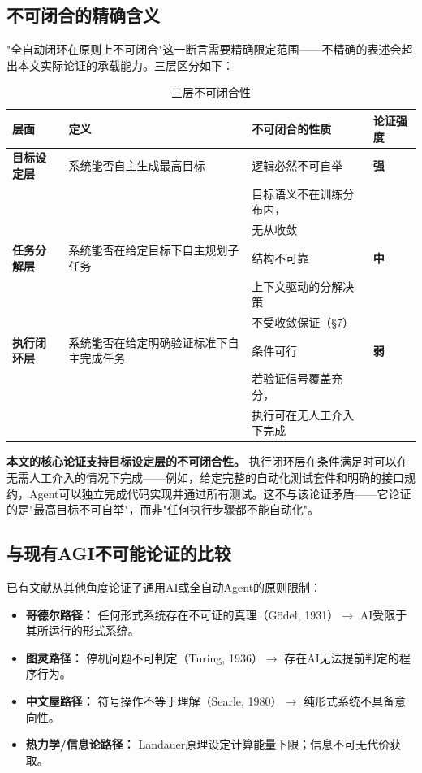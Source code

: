 \documentclass[11pt,a4paper]{ctexart}
\begin{document}
\subsection{不可闭合的精确含义}

"全自动闭环在原则上不可闭合"这一断言需要精确限定范围——不精确的表述会超出本文实际论证的承载能力。三层区分如下：

\begin{table}[htbp]
\centering
\caption{三层不可闭合性}
\label{tab:three_layers}
\begin{tabular}{@{}p{2.5cm}p{4cm}p{2.5cm}p{2.5cm}@{}}
\toprule
\textbf{层面} & \textbf{定义} & \textbf{不可闭合的性质} & \textbf{论证强度} \\
\midrule
\textbf{目标设定层} & 系统能否自主生成最高目标 & 逻辑必然不可自举 & \textbf{强} \\
& & 目标语义不在训练分布内，& \\
& & 无从收敛 & \\
\midrule
\textbf{任务分解层} & 系统能否在给定目标下自主规划子任务 & 结构不可靠 & \textbf{中} \\
& & 上下文驱动的分解决策 & \\
& & 不受收敛保证（§7） & \\
\midrule
\textbf{执行闭环层} & 系统能否在给定明确验证标准下自主完成任务 & 条件可行 & \textbf{弱} \\
& & 若验证信号覆盖充分，& \\
& & 执行可在无人工介入下完成 & \\
\bottomrule
\end{tabular}
\end{table}

\textbf{本文的核心论证支持目标设定层的不可闭合性。} 执行闭环层在条件满足时可以在无需人工介入的情况下完成——例如，给定完整的自动化测试套件和明确的接口规约，Agent可以独立完成代码实现并通过所有测试。这不与该论证矛盾——它论证的是"最高目标不可自举"，而非"任何执行步骤都不能自动化"。

\subsection{与现有AGI不可能论证的比较}

已有文献从其他角度论证了通用AI或全自动Agent的原则限制：

\begin{itemize}[leftmargin=*]
    \item \textbf{哥德尔路径：} 任何形式系统存在不可证的真理（G\"odel, 1931）$\to$ AI受限于其所运行的形式系统。
    \item \textbf{图灵路径：} 停机问题不可判定（Turing, 1936）$\to$ 存在AI无法提前判定的程序行为。
    \item \textbf{中文屋路径：} 符号操作不等于理解（Searle, 1980）$\to$ 纯形式系统不具备意向性。
    \item \textbf{热力学/信息论路径：} Landauer原理设定计算能量下限；信息不可无代价获取。
\end{itemize}
\end{document}
